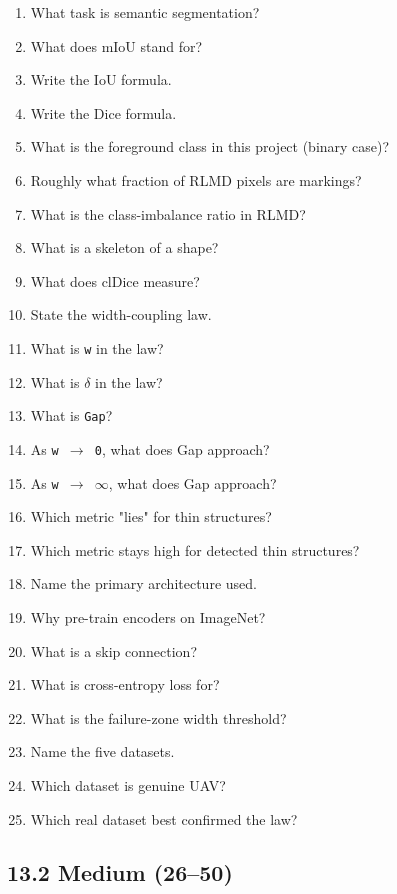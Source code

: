\documentclass[11pt]{article}
\begin{document}
\begin{enumerate}\setlength{\itemsep}{1pt}
\item What task is semantic segmentation?
\item What does mIoU stand for?
\item Write the IoU formula.
\item Write the Dice formula.
\item What is the foreground class in this project (binary case)?
\item Roughly what fraction of RLMD pixels are markings?
\item What is the class-imbalance ratio in RLMD?
\item What is a skeleton of a shape?
\item What does clDice measure?
\item State the width-coupling law.
\item What is \texttt{w} in the law?
\item What is \texttt{$\delta$} in the law?
\item What is \texttt{Gap}?
\item As \texttt{w $\rightarrow$ 0}, what does Gap approach?
\item As \texttt{w $\rightarrow$ $\infty$}, what does Gap approach?
\item Which metric "lies" for thin structures?
\item Which metric stays high for detected thin structures?
\item Name the primary architecture used.
\item Why pre-train encoders on ImageNet?
\item What is a skip connection?
\item What is cross-entropy loss for?
\item What is the failure-zone width threshold?
\item Name the five datasets.
\item Which dataset is genuine UAV?
\item Which real dataset best confirmed the law?
\end{enumerate}

\subsection*{13.2 Medium (26--50)}
\end{document}
